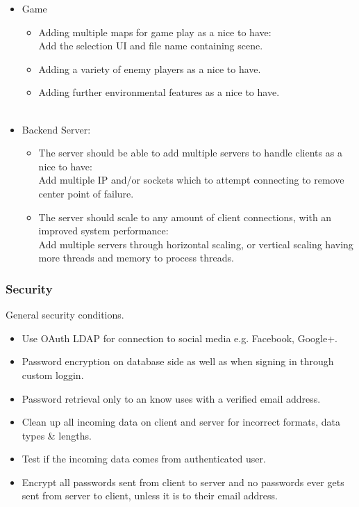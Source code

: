\documentclass[letterpaper]{article}
\begin{document}
					\begin{itemize}
						\item Game
							\begin{itemize}
								\item Adding multiple maps for game play as a nice to have: \\
										Add the selection UI and file name containing scene.
								\item Adding a variety of enemy players as a nice to have.
								\item Adding further environmental features as a nice to have. \\ \\
							\end{itemize}
						\item Backend Server:
							\begin{itemize}
								\item The server should be able to add multiple servers to handle clients as a nice to have: \\
									Add multiple IP and/or sockets which to attempt connecting to remove center point of failure.
								\item The server should scale to any amount of client connections, with an improved system performance: \\
									Add multiple servers through horizontal scaling, or vertical scaling having more threads and memory to process threads.
							\end{itemize}
					\end{itemize}
				
				\subsubsection*{Security}
				\vspace{0.1in}
				
					General security conditions.
					\begin{itemize}
						\item Use OAuth LDAP for connection to social media e.g. Facebook, Google+.
						\item Password encryption on database side as well as when signing in through custom loggin.
						\item Password retrieval only to an know uses with a verified email address.
						\item Clean up all incoming data on client and server for incorrect formats, data types \& lengths.
						\item Test if the incoming data comes from authenticated user.
						\item Encrypt all passwords sent from client to server and no passwords ever gets sent from server to client, unless it is to their email address.
					\end{itemize}
				
\end{document}
